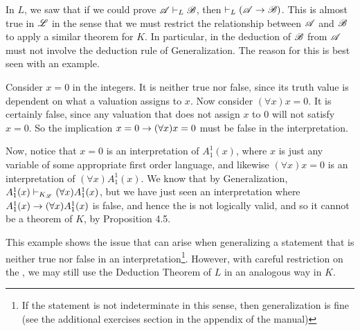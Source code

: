 In \(L\), we saw that if we could prove \(\mathscr{A} \vdash_{L} \mathscr{B}\), then \(\vdash_{L} (\mathscr{A} \rightarrow \mathscr{B})\). This is almost true in \(\mathscr{L}\) in the sense that we must restrict the relationship between \(\mathscr{A}\) and \(\mathscr{B}\) to apply a similar theorem for \(K\). In particular, in the deduction of \(\mathscr{B}\) from \(\mathscr{A}\) must not involve the deduction rule of Generalization. The reason for this is best seen with an example.

Consider \(x = 0\) in the integers. It is neither true nor false, since its truth value is dependent on what a valuation assigns to \(x\). Now consider \((\forall x) x = 0\). It is certainly false, since any valuation that does not assign \(x\) to \(0\) will not satisfy \(x = 0\). So the implication \(x = 0 \rightarrow (\forall x) x = 0\) must be false in the interpretation.

Now, notice that \(x = 0\) is an interpretation of \(A^1_1(x)\), where \(x\) is just any variable of some appropriate first order language, and likewise \((\forall x) x = 0\) is an interpretation of \((\forall x) A^1_1(x)\). We know that by Generalization, \(A^1_1(x) \vdash_{K_{\mathscr{L}}} (\forall x) A^1_1(x)\), but we have just seen an interpretation where \(A^1_1(x) \rightarrow (\forall x) A^1_1(x)\) is false, and hence the \wf{} is not logically valid, and so it cannot be a theorem of \(K\), by Proposition 4.5.

This example shows the issue that can arise when generalizing a statement that is neither true nor false in an interpretation\footnote{If the statement is not indeterminate in this sense, then generalization is fine (see the additional exercises section in the appendix of the manual)}. However, with careful restriction on the \wfs{}, we may still use the Deduction Theorem of \(L\) in an analogous way in \(K\).

